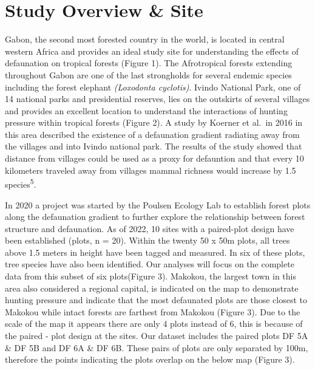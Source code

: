 \documentclass[
  12pt,
]{article}
\begin{document}
\hypertarget{study-overview-site}{%
\section{Study Overview \& Site}\label{study-overview-site}}

Gabon, the second most forested country in the world, is located in
central western Africa and provides an ideal study site for
understanding the effects of defaunation on tropical forests (Figure 1).
The Afrotropical forests extending throughout Gabon are one of the last
strongholds for several endemic species including the forest elephant
\emph{(Loxodonta cyclotis)}. Ivindo National Park, one of 14 national
parks and presidential reserves, lies on the outskirts of several
villages and provides an excellent location to understand the
interactions of hunting pressure within tropical forests (Figure 2). A
study by Koerner et al.~in 2016 in this area described the existence of
a defaunation gradient radiating away from the villages and into Ivindo
national park. The results of the study showed that distance from
villages could be used as a proxy for defauntion and that every 10
kilometers traveled away from villages mammal richness would increase by
1.5 species\textsuperscript{5}.

In 2020 a project was started by the Poulsen Ecology Lab to establish
forest plots along the defaunation gradient to further explore the
relationship between forest structure and defaunation. As of 2022, 10
sites with a paired-plot design have been established (plots, n = 20).
Within the twenty 50 x 50m plots, all trees above 1.5 meters in height
have been tagged and measured. In six of these plots, tree species have
also been identified. Our analyses will focus on the complete data from
this subset of six plots(Figure 3). Makokou, the largest town in this
area also considered a regional capital, is indicated on the map to
demonstrate hunting pressure and indicate that the most defaunated plots
are those closest to Makokou while intact forests are farthest from
Makokou (Figure 3). Due to the scale of the map it appears there are
only 4 plots instead of 6, this is because of the paired - plot design
at the sites. Our dataset includes the paired plots DF 5A \& DF 5B and
DF 6A \& DF 6B. These pairs of plots are only separated by 100m,
therefore the points indicating the plots overlap on the below map
(Figure 3).
\end{document}
